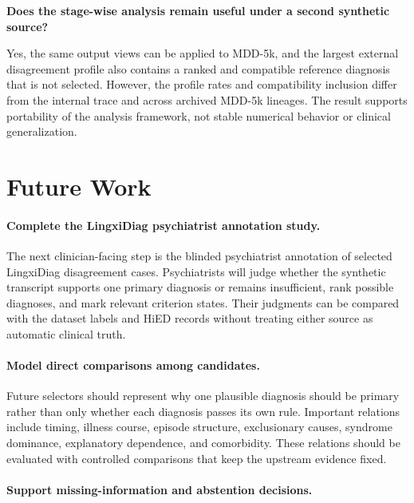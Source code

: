 \begin{description}[style=nextline,leftmargin=1.5cm,labelwidth=1.1cm,itemsep=0.2em,parsep=0pt]
\item[RQ5] \textbf{Does the stage-wise analysis remain useful under a second synthetic source?}

Yes, the same output views can be applied to MDD-5k, and the largest external disagreement profile also contains a ranked and compatible reference diagnosis that is not selected. However, the profile rates and compatibility inclusion differ from the internal trace and across archived MDD-5k lineages. The result supports portability of the analysis framework, not stable numerical behavior or clinical generalization.

\end{description}

\section{Future Work}

\paragraph{Complete the LingxiDiag psychiatrist annotation study.}

The next clinician-facing step is the blinded psychiatrist annotation of selected LingxiDiag disagreement cases. Psychiatrists will judge whether the synthetic transcript supports one primary diagnosis or remains insufficient, rank possible diagnoses, and mark relevant criterion states. Their judgments can be compared with the dataset labels and HiED records without treating either source as automatic clinical truth.

\paragraph{Model direct comparisons among candidates.}

Future selectors should represent why one plausible diagnosis should be primary rather than only whether each diagnosis passes its own rule. Important relations include timing, illness course, episode structure, exclusionary causes, syndrome dominance, explanatory dependence, and comorbidity. These relations should be evaluated with controlled comparisons that keep the upstream evidence fixed.

\paragraph{Support missing-information and abstention decisions.}

